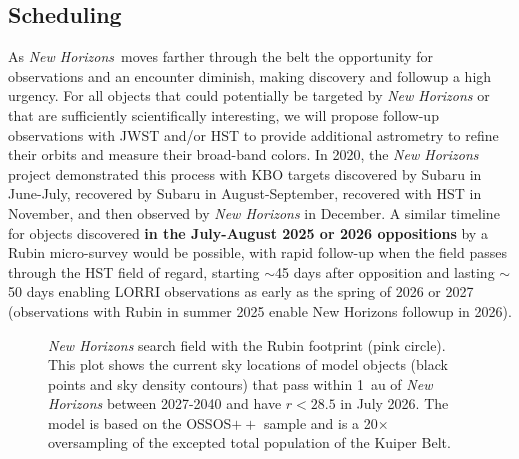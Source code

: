 \documentclass[modern,preprint]{aastex7}
\newcommand\nh{\textit{New Horizons}}
\begin{document}
\subsection{Scheduling}

As \nh\ moves farther through the belt the opportunity for observations and an encounter diminish, making discovery and followup a high urgency. For all objects that could potentially be targeted by {\it New Horizons} or that are sufficiently scientifically interesting, we will propose follow-up observations with JWST and/or HST to provide additional astrometry to refine their orbits and measure their broad-band colors.
In 2020, the {\it New Horizons} project demonstrated this process with KBO targets discovered by Subaru in June-July, recovered by Subaru in August-September, recovered with HST in November, and then observed by {\it New Horizons} in December.
A similar timeline for objects discovered {\bf in the July-August 2025 or 2026 oppositions} by a Rubin micro-survey would be possible, with rapid follow-up when the field passes through the HST field of regard, starting $\sim$45 days after opposition and lasting $\sim$50 days enabling LORRI observations as early as the spring of 2026 or 2027 (observations with Rubin in summer 2025 enable New Horizons followup in 2026).

\begin{figure}
\end{figure}

\begin{figure}
\caption{\label{fig-RubinField}
{\it New Horizons} search field with the Rubin footprint (pink circle). This plot shows the current sky locations of model objects (black points and sky density contours) that pass within 1~au of {\it New Horizons} between 2027-2040 and have $r<28.5$ in July 2026. The model is based on the OSSOS$++$ sample \citep{Petit2023DPS} and is a 20$\times$ oversampling of the excepted total population of the Kuiper Belt.}
\end{figure}
\end{document}
